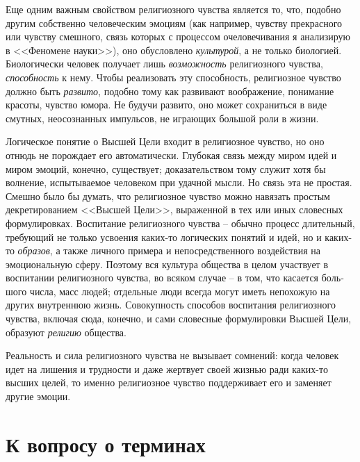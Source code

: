 \documentclass{book}
\begin{document}
Еще одним важным свойством религиозного чувства являет­ся то, что, подобно другим собственно человеческим эмоциям (как например, чувству прекрасного или чувству смешного, связь которых с процессом очеловечивания я анализирую в <<Феномене науки>>), оно обусловлено \textit{культурой},  а не только биологией. Биологически человек получает лишь \textit{возможность} религиозного чувства, \textit{способность}  к нему. Чтобы реализовать эту способность, религиозное чувство должно быть \textit{развито}, подобно тому как развивают воображение, понимание красоты, чувство юмора. Не будучи развито, оно может сохраниться в виде смутных, неосознанных импульсов, не играющих большой роли в жизни.

Логическое понятие о Высшей Цели входит в религиозное чувство, но оно отнюдь не порождает его автоматически. Глубокая связь между миром идей и миром эмоций, конечно, существует; доказательством тому служит хотя бы волнение, испытываемое человеком при удачной мысли. Но связь эта не простая. Смешно было бы думать, что религиозное чувство можно навязать простым декретированием <<Высшей Цели>>, выраженной в тех или иных словесных формулировках. Воспитание религиозного чувства -- обычно процесс длительный, требующий не только усвоения каких-то логических понятий и идей, но и каких-то \textit{образов},  а также личного примера и непосредственного воздействия на эмоциональную сферу. Поэтому вся культура общества в целом участвует в воспитании религиозного чувства, во всяком случае -- в том, что касается боль­шого числа, масс людей; отдельные люди всегда могут иметь непохожую на других внутреннюю жизнь. Совокупность способов воспитания религиозного чувства, включая сюда, конечно, и сами словесные формулировки Высшей Цели, 
образуют \textit{рели­гию}  общества.

Реальность и сила религиозного чувства не вызывает сомне­ний: когда человек идет на лишения и трудности и даже жертвует своей жизнью ради каких-то высших целей, то именно религиозное чувство поддерживает его и заменяет другие эмоции.


\section{К вопросу о терминах}
\end{document}
